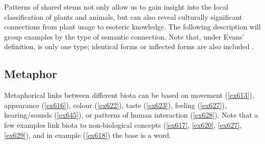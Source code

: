 Patterns of shared stems not only allow us to gain insight into the local classification of plants and animals, but can also reveal culturally significant connections from plant usage to esoteric knowledge. The following description will group examples by the type of semantic connection. Note that, under Evans' definition,  is only one type; identical forms or inflected forms are also included \citep[136]{Evans:1997vj}.

\subsection{Metaphor}\label{redupmetaphor}

Metaphorical links between different biota can be based on movement (\ref{ex613}), appearance (\ref{ex616}), colour (\ref{ex622}), taste (\ref{ex623}), feeling (\ref{ex627}), hearing/sounds (\ref{ex645}), or patterns of human interaction (\ref{ex628}). Note that a few examples link biota to non-biological concepts (\ref{ex617}, \ref{ex620}, \ref{ex627}, \ref{ex629}), and in example (\ref{ex618}) the base is a  word.

